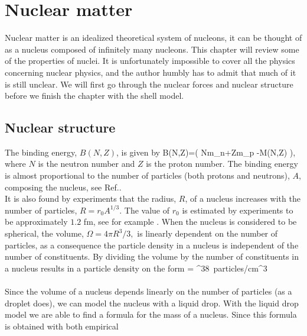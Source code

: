\chapter{Nuclear matter} 

Nuclear matter is an idealized theoretical system of nucleons, it can be thought of as a nucleus
composed of infinitely many nucleons. This chapter will review some of the
properties of  nuclei. It is unfortunately impossible to cover all the physics
concerning nuclear physics, and the author humbly has to admit that much of it 
is still unclear. We will first go through the nuclear forces and nuclear
structure before we finish the chapter with the shell model. 



\section{Nuclear structure} 
\label{sec:semiemp}
The binding energy, $B(N,Z)$, is given by
\be
B(N,Z)=\big( Nm_n+Zm_p -M(N,Z) \big),
\ee
where $N$ is the neutron number and $Z$ is the proton number. The binding energy
is almost proportional to the number of particles (both protons and neutrons), 
$A$, composing the nucleus, see Ref.\cite{siemenselementsnuclei}.\\
It is also found by experiments that the radius, $R$, of a nucleus increases with the number of particles, $R=r_0A^{1/3}.$ The value of $r_0$ is estimated by experiments to be approximately  $1.2$ fm, see for example \cite{kraneintro}. When the nucleus is considered to be spherical, the volume, 
$\Omega=4 \pi R^3/3,$ is linearly dependent on the number of particles, as a consequence the particle density in a nucleus is independent of the number of constituents. By dividing the volume by the number of constituents in a nucleus results in a particle density on the form
\be
{}= ^{38} \,\mbox{particles/cm}^3\\
\ee
\\
Since the volume of a nucleus depends linearly on the number of particles (as a droplet does), we can 
model the nucleus with a liquid drop. With the liquid drop model we are able to find a formula
for the mass of a nucleus.  Since this formula is obtained with both empirical
